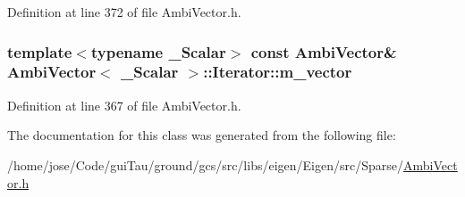 Definition at line 372 of file Ambi\-Vector.\-h.

\hypertarget{class_ambi_vector_1_1_iterator_aaa2a76c6c5505e34055e7c00ce05d621}{
\subsubsection[{m\-\_\-vector}]{\setlength{\rightskip}{0pt plus 5cm}template$<$typename \-\_\-\-Scalar$>$ const {\bf Ambi\-Vector}\& {\bf Ambi\-Vector}$<$ \-\_\-\-Scalar $>$\-::Iterator\-::m\-\_\-vector\hspace{0.3cm}{\ttfamily [protected]}}}\label{class_ambi_vector_1_1_iterator_aaa2a76c6c5505e34055e7c00ce05d621}


Definition at line 367 of file Ambi\-Vector.\-h.



The documentation for this class was generated from the following file\-:\begin{DoxyCompactItemize}
\item 
/home/jose/\-Code/gui\-Tau/ground/gcs/src/libs/eigen/\-Eigen/src/\-Sparse/\hyperlink{_ambi_vector_8h}{Ambi\-Vector.\-h}\end{DoxyCompactItemize}
